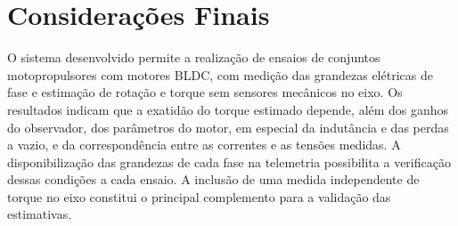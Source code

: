 \section{Considerações Finais}
\label{sec:consideracoes_finais}

O sistema desenvolvido permite a realização de ensaios de conjuntos
motopropulsores com motores BLDC, com medição das grandezas elétricas de fase
e estimação de rotação e torque sem sensores mecânicos no eixo. Os resultados
indicam que a exatidão do torque estimado depende, além dos ganhos do
observador, dos parâmetros do motor, em especial da indutância e das perdas a
vazio, e da correspondência entre as correntes e as tensões medidas. A
disponibilização das grandezas de cada fase na telemetria possibilita a
verificação dessas condições a cada ensaio. A inclusão de uma medida
independente de torque no eixo constitui o principal complemento para a
validação das estimativas.
